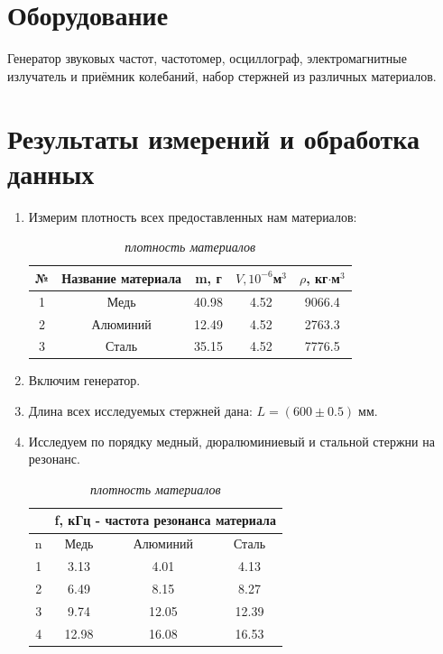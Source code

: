 \documentclass[a4paper, 10pt, twocolumn]{article}
\begin{document}
\section{Оборудование}
Генератор звуковых частот, частотомер, осциллограф,
электромагнитные излучатель и приёмник колебаний, набор стержней из различных материалов.

\section{Результаты измерений и обработка данных}
\begin{enumerate}
    \item Измерим плотность всех предоставленных нам материалов:
    \centering
    \begin{table}[h]
        \centering
        \caption{\textit{плотность материалов}}
        \label{tab:my_label}
        \begin{tabular}{|c|c|c|c|c|}
        \hline
        № & Название материала & m, г & $V, 10^{-6}$м$^{3}$ & $\rho$, кг$\cdot$м$^3$ \\ \hline
        1 & Медь               & 40.98 & 4.52 & 9066.4 \\ \hline
        2 & Алюминий           & 12.49  & 4.52 & 2763.3 \\ \hline
        3 & Сталь              & 35.15  & 4.52 & 7776.5 \\ \hline
        \end{tabular}
    \end{table}
    \item Включим генератор.
    \item Длина всех исследуемых стержней дана: $L = (600\pm0.5)\;\text{мм}$.
    \item Исследуем по порядку медный, дюралюминиевый и стальной стержни на
    резонанс.
    \begin{table}[h]
        \centering
        \caption{\textit{плотность материалов}}
        \label{tab:my_label}
        \begin{tabular}{|c||c|c|c|} \hline
        & \multicolumn{3}{c|}{f, кГц - частота резонанса материала} \\ \hline
        n & Медь & Алюминий & Сталь \\ \hline
        1 & 3.13  & 4.01  & 4.13 \\ \hline
        2 & 6.49  & 8.15  & 8.27 \\ \hline
        3 & 9.74  & 12.05 & 12.39 \\ \hline
        4 & 12.98 & 16.08 & 16.53 \\ \hline

\end{tabular}
\end{table}
\end{enumerate}
\end{document}
